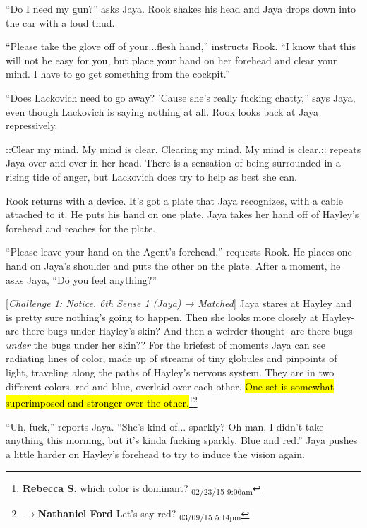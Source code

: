 ``Do I need my gun?'' asks Jaya.  Rook shakes his head and Jaya drops down into the car with a loud thud.



``Please take the glove off of your...flesh hand,'' instructs Rook.  ``I know that this will not be easy for you, but place your hand on her forehead and clear your mind.  I have to go get something from the cockpit.''

``Does Lackovich need to go away?  'Cause she's really fucking chatty,'' says Jaya, even though Lackovich is saying nothing at all.  Rook looks back at Jaya repressively.

 {\color[RGB]{74,134,232}::Clear my mind.  My mind is clear.  Clearing my mind.  My mind is clear.:: } repeats Jaya over and over in her head.  There is a sensation of being surrounded in a rising tide of anger, but Lackovich does try to help as best she can.



Rook returns with a device. It's got a plate that Jaya recognizes, with a cable attached to it.  He puts his hand on one plate.  Jaya takes her hand off of Hayley's forehead and reaches for the plate.

``Please leave your hand on the Agent's forehead,'' requests Rook.  He places one hand on Jaya's shoulder and puts the other on the plate.  After a moment, he asks Jaya, ``Do you feel anything?''

{[}\textit{Challenge 1: Notice.  6th Sense 1 (Jaya) → Matched}{]}  Jaya stares at Hayley and is pretty sure nothing's going to happen.  Then she looks more closely at Hayley- are there bugs under Hayley's skin?  And then a weirder thought- are there bugs \textit{under} the bugs under her skin??  For the briefest of moments Jaya can see radiating lines of color, made up of streams of tiny globules and pinpoints of light, traveling along the paths of Hayley's nervous system.  They are in two different colors, red and blue, overlaid over each other.  \hl{One set is somewhat superimposed and stronger over the other.}\footnote{\textbf{Rebecca S. }which color is dominant? \textsubscript{02/23/15 9:06am}}\footnote{$\rightarrow$\textbf{Nathaniel Ford }Let's say red? \textsubscript{03/09/15 5:14pm}}

``Uh, fuck,'' reports Jaya.  ``She's kind of... sparkly?  Oh man, I didn't take anything this morning, but it's kinda fucking sparkly.  Blue and red.''  Jaya pushes a little harder on Hayley's forehead to try to induce the vision again.

